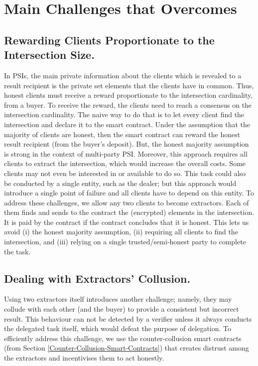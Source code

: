 




\section{Main Challenges that \withRew Overcomes}\label{sec::Annesidora-challenges}


\subsection{Rewarding Clients Proportionate to the Intersection Size.}
In PSIs, the main private information about the clients which is revealed to a result recipient is the private set elements that the clients have in common. Thus, honest clients must receive a reward proportionate to the intersection cardinality, from a buyer. To receive the reward, the clients need to reach a consensus on the intersection cardinality. The naive way to do that is to let every client find the intersection and declare it to the smart contract. Under the assumption that the majority of clients are honest, then the smart contract can reward the honest result recipient (from the buyer's deposit). But, the honest majority assumption is strong in the context of multi-party PSI. Moreover, this approach requires all clients to extract the intersection, which would increase the overall costs.  Some clients may not even be interested in or available to do so. This task could also be conducted by a single entity, such as the dealer; but this approach would introduce a single point of failure and all clients have to depend on this entity.  
%
To address these challenges, we allow any two clients to become extractors.  Each of them finds and sends to the contract the (encrypted) elements in the intersection. It is paid by the contract if the contract concludes that it is honest. This lets us avoid (i) the honest majority assumption, (ii) requiring all clients to find the intersection, and (iii) relying on a single trusted/semi-honest party to complete the task. 





 \vspace{-1mm}
\subsection{Dealing with Extractors' Collusion.}
%
Using two extractors itself introduces another challenge; namely, they may collude with each other (and the buyer) to provide a consistent but incorrect result. This behaviour can not be detected by a verifier unless it always conducts the delegated task itself, which would defeat the purpose of delegation. To efficiently address this challenge, we use the counter-collusion smart contracts (from Section \ref{Counter-Collusion-Smart-Contracts}) that creates distrust among the extractors and incentivises them to act honestly. 




 
